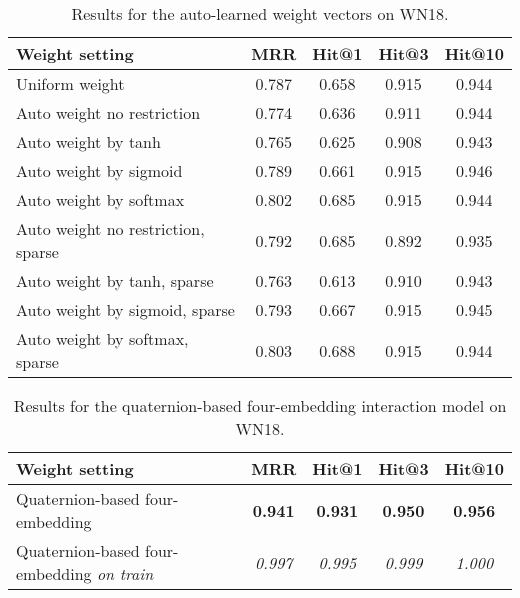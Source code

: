 \documentclass[sigconf,edbt]{acmart-edbt2019}
\begin{document}
\begin{table*}[ht]
\centering
	
	\caption{Results for the auto-learned weight vectors on WN18.}
	\label{tab:result_learnweight}
	
	\begin{tabular}{l|c|c|c|c}
		\hline 
		\textbf{Weight setting} & \textbf{MRR} & \textbf{Hit@1} & \textbf{Hit@3} & \textbf{Hit@10}\\ 
		\hline
		
		Uniform weight  & 0.787 & 0.658 & 0.915 & 0.944\\ 
		\hline
		
		Auto weight no restriction & 0.774 & 0.636 & 0.911 & 0.944\\ 
		Auto weight  by tanh & 0.765 & 0.625 & 0.908 & 0.943\\ 
		Auto weight  by sigmoid & 0.789 & 0.661 & 0.915 & 0.946\\ 
		Auto weight  by softmax & 0.802 & 0.685 & 0.915 & 0.944\\ 
		Auto weight no restriction, sparse & 0.792 & 0.685 & 0.892 & 0.935\\ 
		Auto weight  by tanh, sparse & 0.763 & 0.613 & 0.910 & 0.943\\ 
		Auto weight  by sigmoid, sparse & 0.793 & 0.667 & 0.915 & 0.945\\ 
		Auto weight  by softmax, sparse & 0.803 & 0.688 & 0.915 & 0.944\\ 
		\hline 
	\end{tabular}
\end{table*}

\begin{table*}[ht]
\centering
	
	\caption{Results for the quaternion-based four-embedding interaction model on WN18.}
	\label{tab:result_quaternion}
	
	\begin{tabular}{l|c|c|c|c}
		\hline 
		\textbf{Weight setting} & \textbf{MRR} & \textbf{Hit@1} & \textbf{Hit@3} & \textbf{Hit@10}\\ 
		\hline
		
		Quaternion-based four-embedding & \textbf{0.941} & \textbf{0.931} & \textbf{0.950} & \textbf{0.956}\\ 
		Quaternion-based four-embedding \textit{on train} & \textit{0.997} & \textit{0.995} & \textit{0.999} & \textit{1.000}\\ 
		\hline 
	\end{tabular}
\end{table*}
\end{document}
